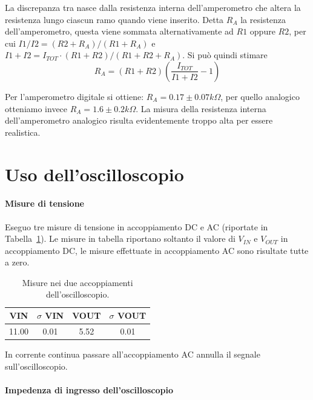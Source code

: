 \documentclass[10pt,a4paper]{article}
\begin{document}

La discrepanza tra  nasce dalla resistenza interna dell'amperometro che altera la resistenza lungo ciascun ramo quando viene inserito. 
Detta $R_A$ la resistenza dell'amperometro,
questa viene sommata alternativamente ad $R1$ oppure $R2$, per cui $I1/I2 = (R2+R_A)/(R1+R_A)$ 
e $I1+I2 = I_{TOT}\cdot(R1+R2)/(R1+R2+R_A)$.
Si pu\`o quindi stimare 
$$
R_A = (R1+R2)\left(\frac{I_{TOT}}{I1+I2} - 1 \right)
$$

Per l'amperometro digitale si ottiene: $R_A = 0.17 \pm 0.07 k\Omega$, per quello analogico otteniamo invece $R_A = 1.6 \pm 0.2 k\Omega$. La misura della resistenza interna dell'amperometro analogico risulta evidentemente troppo alta per essere realistica.  

\section{Uso dell'oscilloscopio}

\paragraph{Misure di tensione}

Eseguo tre misure di tensione in accoppiamento DC e AC (riportate in Tabella~\ref{t:par3}). 
Le misure in tabella riportano soltanto il valore di $V_{IN}$ e $V_{OUT}$ in accoppiamento DC, le misure effettuate in accoppiamento AC sono risultate tutte a zero.

\begin{table}[h]
\centering
\begin{tabular}{|c|c|c|c|}
\hline 
VIN &  $\sigma$ VIN & VOUT &  $\sigma$ VOUT\\

\hline 

11.00&0.01&5.52&0.01\\

\hline 
\end{tabular} 
\caption{Misure nei due accoppiamenti dell'oscilloscopio.\label{t:par3}}
\end{table}

In corrente continua passare all'accoppiamento AC annulla il segnale sull'oscilloscopio. 

\paragraph{Impedenza di ingresso dell'oscilloscopio}
\end{document}
